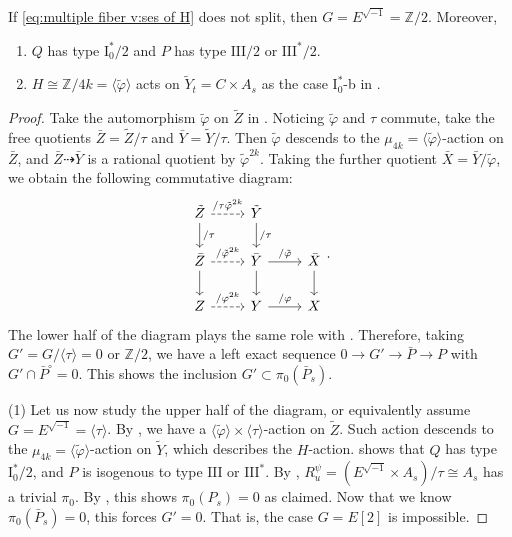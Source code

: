 \documentclass[reqno, letterpaper]{amsart}
\numberwithin{equation}{subsection}
\let\to\longrightarrow
\newcommand{\ZZ}{\mathbb{Z}}
\begin{document}
		\begin{corollary} \label{cor:multiple fiber v:when H doesnt split}
			If \eqref{eq:multiple fiber v:ses of H} does not split, then $G = E^{\sqrt{-1}} = \ZZ/2$. Moreover,
			\begin{enumerate}
				\item $Q$ has type $\mathrm I_0^*/2$ and $P$ has type $\mathrm{III}/2$ or $\mathrm{III}^*/2$.
				\item $H \cong \ZZ/4k = \langle \tilde \varphi \rangle$ acts on $\tilde Y_t = C \times A_s$ as the case $\mathrm I_0^*$-b in .
			\end{enumerate}
		\end{corollary}
		\begin{proof}
			Take the automorphism $\tilde \varphi$ on $\tilde Z$ in . Noticing $\tilde \varphi$ and $\tau$ commute, take the free quotients $\bar Z = \tilde Z / \tau$ and $\bar Y = \tilde Y / \tau$. Then $\tilde \varphi$ descends to the $\mu_{4k} = \langle \tilde \varphi \rangle$-action on $\bar Z$, and $\bar Z \dashrightarrow \bar Y$ is a rational quotient by $\tilde \varphi^{2k}$. Taking the further quotient $\bar X = \bar Y / \tilde \varphi$, we obtain the following commutative diagram:
			\[\begin{tikzcd}[column sep=normal]
				\tilde Z \arrow[r, dashed, "/\tau \tilde \varphi^{2k}"] \arrow[d, "/\tau"] & \tilde Y \arrow[d, "/\tau"] \\
				\bar Z \arrow[r, dashed, "/\tilde \varphi^{2k}"] \arrow[d] & \bar Y \arrow[r, "/\tilde \varphi"] \arrow[d] & \bar X \arrow[d] \\
				Z \arrow[r, dashed, "/\varphi^{2k}"] & Y \arrow[r, "/\varphi"] & X
			\end{tikzcd}.\]
			The lower half of the diagram plays the same role with . Therefore, taking $G' = G / \langle \tau \rangle = 0$ or $\ZZ/2$, we have a left exact sequence $0 \to G' \to \bar P \to P$ with $G' \cap \bar P^\circ = 0$. This shows the inclusion $G' \subset \pi_0 (\bar P_s)$.
			
			\medskip
			
			(1) Let us now study the upper half of the diagram, or equivalently assume $G = E^{\sqrt{-1}} = \langle \tau \rangle$. By , we have a $\langle \tilde \varphi \rangle \times \langle \tau \rangle$-action on $\tilde Z$. Such action descends to the $\mu_{4k} = \langle \tilde \varphi \rangle$-action on $\tilde Y$, which describes the $H$-action.  shows that $Q$ has type $\mathrm I_0^*/2$, and $P$ is isogenous to type $\mathrm{III}$ or $\mathrm{III}^*$. By , $R_u^\psi = (E^{\sqrt{-1}} \times A_s)/\tau \cong A_s$ has a trivial $\pi_0$. By , this shows $\pi_0(P_s) = 0$ as claimed. Now that we know $\pi_0 (\bar P_s) = 0$, this forces $G' = 0$. That is, the case $G = E[2]$ is impossible.
			

\end{proof}
\end{document}
